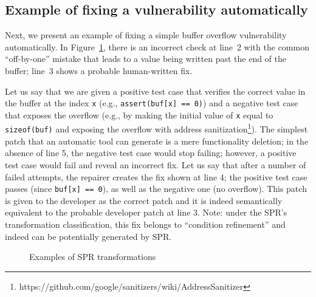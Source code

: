\subsection{Example of fixing a vulnerability automatically}

Next, we present an example of fixing a simple buffer overflow vulnerability automatically. In Figure~\ref{figure:example}, there is an incorrect check at line~2 with the common ``off-by-one'' mistake that leads to a value being written past the end of the buffer; line~3 shows a probable human-written fix.

Let us say that we are given a positive test case that verifies the correct value in the buffer at the index \texttt{x} (e.g., \texttt{assert(buf[x] == 0)}) and a negative test case that exposes the overflow (e.g., by making the initial value of \texttt{x} equal to \texttt{sizeof(buf)} and exposing the overflow with address sanitization\footnote{https://github.com/google/sanitizers/wiki/AddressSanitizer}).
The simplest patch that an automatic tool can generate is a mere functionality deletion; in the absence of line 5, the negative test case would stop failing; however, a positive test case would fail and reveal an incorrect fix.
Let us say that after a number of failed attempts, the repairer creates the fix shown at line 4; the positive test case passes (since \texttt{buf[x] == 0}), as well as the negative one (no overflow).
This patch is given to the developer as the correct patch and it is indeed semantically equivalent to the probable developer patch at line 3.
Note: under the SPR's transformation classification, this fix belongs to ``condition refinement'' and indeed can be potentially generated by SPR.
\begin{figure}



\vspace{0.1in}
\small \caption{Examples of SPR transformations}
    \label{figure:example}
\vspace{-0.2in}
\end{figure}

